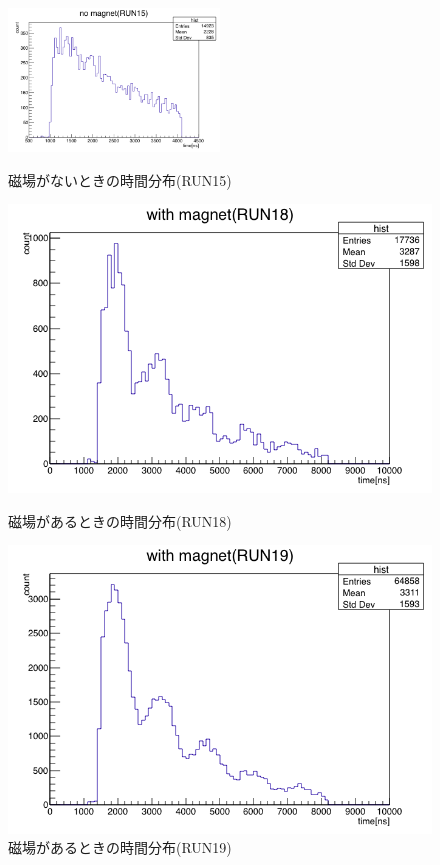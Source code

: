 \begin{figure}[H]
  \centering
  \includegraphics[width  = 0.5\textwidth]{figure/mino/no_mag.png}
  \caption{磁場がないときの時間分布(RUN15)}
  \label{fig:no_mag}
  \begin{minipage}{0.45\hsize}
    \centering
    \includegraphics[width  = 1.0\textwidth]{figure/mino/with_mag_RUN18.png}
    \caption{磁場があるときの時間分布(RUN18)}
  \end{minipage}
  \begin{minipage}{0.45\hsize}
    \centering
    \includegraphics[width  = 1.0\textwidth]{figure/mino/with_mag_RUN19.png}
    \caption{磁場があるときの時間分布(RUN19)}
    \label{fig:with_mag_RUN19}
  \end{minipage}
\end{figure}

